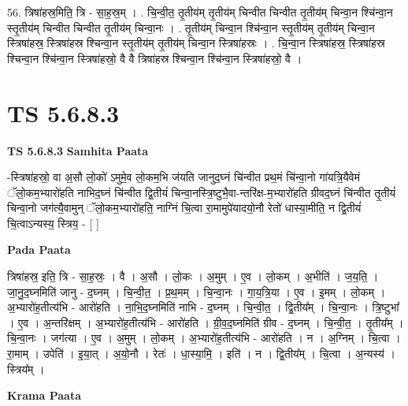 \documentclass[17pt]{extarticle}
\begin{document}
56. त्रिषा॑हस्र॒मिति॒ त्रि - सा॒ह॒स्र॒म् । . चि॒न्वी॒त॒ तृ॒तीय॑म् तृ॒तीय॑म् चिन्वीत चिन्वीत तृ॒तीय॑म् चिन्वा॒न श्चि॑न्वा॒न स्तृ॒तीय॑म् चिन्वीत चिन्वीत तृ॒तीय॑म् चिन्वा॒नः । . तृ॒तीय॑म् चिन्वा॒न श्चि॑न्वा॒न स्तृ॒तीय॑म् तृ॒तीय॑म् चिन्वा॒न स्त्रिषा॑हस्र॒ स्त्रिषा॑हस्र श्चिन्वा॒न स्तृ॒तीय॑म् तृ॒तीय॑म् चिन्वा॒न स्त्रिषा॑हस्रः । . चि॒न्वा॒न स्त्रिषा॑हस्र॒ स्त्रिषा॑हस्र श्चिन्वा॒न श्चि॑न्वा॒न स्त्रिषा॑हस्रो॒ वै वै त्रिषा॑हस्र श्चिन्वा॒न श्चि॑न्वा॒न स्त्रिषा॑हस्रो॒ वै । \newline
\pagebreak
{}

\section{ TS 5.6.8.3 }

\textbf{TS 5.6.8.3 } \newline
\textbf{Samhita Paata} \newline

-स्त्रिषा॑हस्रो॒ वा अ॒सौ लो॒को॑ ऽमुमे॒व लो॒कम॒भि ज॑यति जानुद॒घ्नं चि॑न्वीत प्रथ॒मं चि॑न्वा॒नो गा॑यत्रि॒यैवेमं ॅलो॒कम॒भ्यारो॑हति नाभिद॒घ्नं चि॑न्वीत द्वि॒तीयं॑ चिन्वा॒नस्त्रि॒ष्टुभै॒वा-न्तरि॑क्ष-म॒भ्यारो॑हति ग्रीवद॒घ्नं चि॑न्वीत तृ॒तीयं॑ चिन्वा॒नो जग॑त्यै॒वामुन् ॅलो॒कम॒भ्यारो॑हति॒ नाग्निं चि॒त्वा रा॒मामुपे॑यादयो॒नौ रेतो॑ धास्या॒मीति॒ न द्वि॒तीयं॑ चि॒त्वाऽन्यस्य॒ स्त्रिय॒ - [  ] \newline

\textbf{Pada Paata} \newline

त्रिषा॑हस्र॒ इति॒ त्रि - सा॒ह॒स्रः॒ । वै । अ॒सौ । लो॒कः । अ॒मुम् । ए॒व । लो॒कम् । अ॒भीति॑ । ज॒य॒ति॒ । जा॒नु॒द॒घ्नमिति॑ जानु - द॒घ्नम् । चि॒न्वी॒त॒ । प्र॒थ॒मम् । चि॒न्वा॒नः । गा॒य॒त्रि॒या । ए॒व । इ॒मम् । लो॒कम् । अ॒भ्यारो॑ह॒तीत्य॑भि - आरो॑हति । ना॒भि॒द॒घ्नमिति॑ नाभि - द॒घ्नम् । चि॒न्वी॒त॒ ।  द्वि॒तीय᳚म् । चि॒न्वा॒नः । त्रि॒ष्टुभा᳚ । ए॒व । अ॒न्तरि॑क्षम् । अ॒भ्यारो॑ह॒तीत्य॑भि - आरो॑हति । ग्री॒व॒द॒घ्नमिति॑ ग्रीव - द॒घ्नम् । चि॒न्वी॒त॒ । तृ॒तीय᳚म् । चि॒न्वा॒नः । जग॑त्या । ए॒व । अ॒मुम् ।  लो॒कम् । अ॒भ्यारो॑ह॒तीत्य॑भि - आरो॑हति । न । अ॒ग्निम् । चि॒त्वा । रा॒माम् । उपेति॑ । इ॒या॒त् । अ॒यो॒नौ । रेतः॑ । धा॒स्या॒मि॒ । इति॑ । न । द्वि॒तीय᳚म् । चि॒त्वा । अ॒न्यस्य॑ । स्त्रिय᳚म् ।  \newline


\textbf{Krama Paata} \newline
\end{document}

